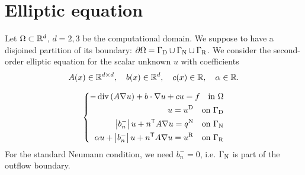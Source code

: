 %
\section{Elliptic equation}\label{sec:Heat}
%
Let $\Omega\subset \mathbb R^d$, $d=2,3$ be the computational domain. We suppose to have a disjoined partition of its boundary:
$\partial\Omega=\Gamma_{\rm D}\cup\Gamma_{\rm N}\cup\Gamma_{\rm R}$.
%
We consider the second-order elliptic equation for the scalar unknown $u$ with coefficients
%
\begin{align*}
A(x)\in\mathbb R^{d\times d},\quad b(x)\in\mathbb R^d,\quad c(x)\in\mathbb R,\quad \alpha\in\mathbb R.
\end{align*}
%
%
\begin{yellowbox}
\begin{equation}\label{eq:EllipticEquation}
%
\left\{
\begin{aligned}
-\div\left(A\nabla u\right)+b\cdot\nabla u + c u = f \quad \mbox{in $\Omega$}\\
u = \uD \quad \mbox{on $\GammaD$}\\
\abs{b_n^-} u + \transpose{n}A\nabla u = \qN \quad \mbox{on $\GammaN$}\\
\alpha u + \abs{b_n^-} u + \transpose{n}A\nabla u= \uR \quad \mbox{on $\GammaR$}
\end{aligned}
\right.
%
\end{equation}
For the standard Neumann condition, we need $b_n^-=0$, i.e. $\Gamma_{\rm N}$ is part of the outflow boundary.
\end{yellowbox}
%
%
